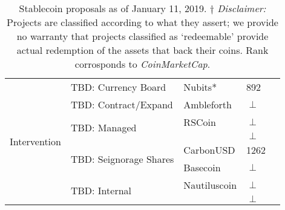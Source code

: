 \begin{table}[t]
\begin{tabular}{|l|l|l|l|l|}
\multirow{8}{*}{Intervention}                                                           
						& \multirow{1}{*}{TBD: Currency Board} 							& Nubits* 			& 892 \\ \cline{2-4}
						& \multirow{1}{*}{TBD: Contract/Expand}  						& Ambleforth		& $\perp$  \\ \cline{2-4}
						& \multirow{2}{*}{TBD: Managed}  								& RSCoin 			& $\perp$  \\ \cline{3-4}
						&														&  				& $\perp$ \\ \cline{2-4}
						& \multirow{2}{*}{TBD: Seignorage Shares}  						& CarbonUSD		& 1262 \\ \cline{3-4}
						&														& Basecoin 		& $\perp$ \\ \cline{2-4}
						& \multirow{2}{*}{TBD: Internal }  								& Nautiluscoin 		& $\perp$ \\ \cline{3-4}
						&														&  				& $\perp$ \\ \cline{2-4}
\hline
\end{tabular}
\caption{Stablecoin proposals as of January 11, 2019. $\dagger$ \textit{Disclaimer:} Projects are classified according to what they assert; \eg we provide no warranty that projects classified as `redeemable' provide actual redemption of the assets that back their coins. Rank corrosponds to \textit{CoinMarketCap}.\label{tab:stablecoins}}
\end{table}
